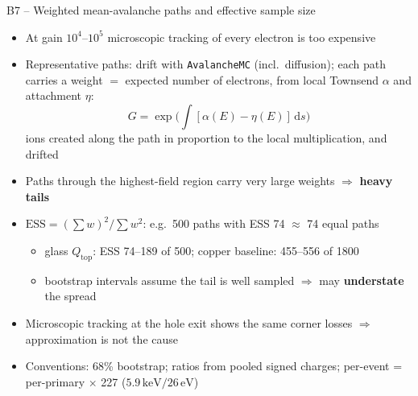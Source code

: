 \documentclass[aspectratio=169,11pt]{beamer}
\newcommand{\backlink}[1]{\hfill\hyperlink{#1}{\beamerreturnbutton{back}}}
\newcommand{\Qtop}{Q_\text{top}}
\begin{document}
\begin{frame}[label=b-ess]{B7 -- Weighted mean-avalanche paths and effective sample size}
  \small
  \begin{itemize}
    \item At gain $10^4$--$10^5$ microscopic tracking of every electron is too expensive
    \item Representative paths: drift with \texttt{AvalancheMC} (incl.\ diffusion); each path carries a weight $=$ expected number of electrons, from local Townsend $\alpha$ and attachment $\eta$:
      \[ G = \exp\!\Big(\int[\alpha(E)-\eta(E)]\,\mathrm{d}s\Big) \]
      ions created along the path in proportion to the local multiplication, and drifted
    \item Paths through the highest-field region carry very large weights $\Rightarrow$ \textbf{heavy tails}
    \item $\text{ESS} = (\sum w)^2/\sum w^2$: e.g.\ 500 paths with ESS 74 $\approx$ 74 equal paths
      \begin{itemize}
        \item glass $\Qtop$: ESS 74--189 of 500; copper baseline: 455--556 of 1800
        \item bootstrap intervals assume the tail is well sampled $\Rightarrow$ may \textbf{understate} the spread
      \end{itemize}
    \item Microscopic tracking at the hole exit shows the same corner losses $\Rightarrow$ approximation is not the cause
    \item Conventions: 68\% bootstrap; ratios from pooled signed charges; per-event = per-primary $\times$ 227 ($5.9\,\text{keV}/26\,\text{eV}$)
  \end{itemize}
  \backlink{m-sim}
\end{frame}
\end{document}
